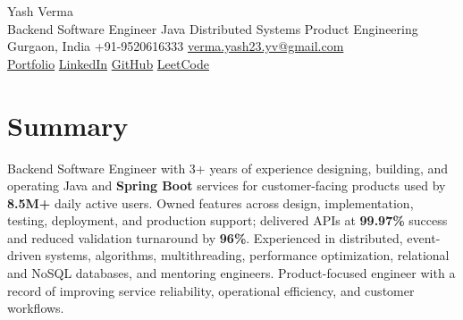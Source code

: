 \documentclass[letterpaper,11pt]{article}
\begin{document}
\begin{center}
  {\Huge Yash Verma} \\
  \small Backend Software Engineer \textperiodcentered{} Java \textperiodcentered{} Distributed Systems \textperiodcentered{} Product Engineering \\
  \vspace{5pt}
  \small Gurgaon, India \textbar{} +91-9520616333 \textbar{}
  \href{mailto:verma.yash23.yv@gmail.com}{verma.yash23.yv@gmail.com} \\
  \vspace{7pt}
  \href{https://yashverma230600.github.io/yashV-portfolio/}{Portfolio} \textbar{}
  \href{https://www.linkedin.com/in/yash-verma-9243a7193/}{LinkedIn} \textbar{}
  \href{https://github.com/yashverma230600}{GitHub} \textbar{}
  \href{https://leetcode.com/yashverma230600}{LeetCode}
  \vspace{-8pt}
\end{center}

\section{Summary}
\begin{itemize}[leftmargin=0.15in, label={}]
  \small{\item{
    Backend Software Engineer with 3+ years of experience designing, building, and operating Java and \textbf{Spring Boot} services for customer-facing products used by \textbf{8.5M+} daily active users. Owned features across design, implementation, testing, deployment, and production support; delivered APIs at \textbf{99.97\%} success and reduced validation turnaround by \textbf{96\%}. Experienced in distributed, event-driven systems, algorithms, multithreading, performance optimization, relational and NoSQL databases, and mentoring engineers. Product-focused engineer with a record of improving service reliability, operational efficiency, and customer workflows.
  }}
\end{itemize}
\vspace{-8pt}

\end{document}
